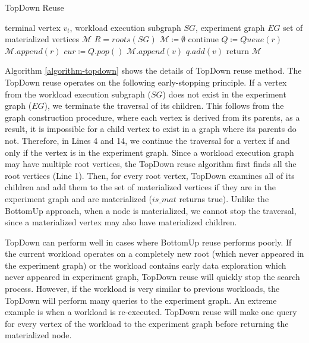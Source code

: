 {\begin{algorithm}[h]
\caption{TopDown Reuse}\label{algorithm-topdown}
\begin{algorithmic}[1]
\Require terminal vertex $v_t$, workload execution subgraph  $SG$, experiment graph $EG$ 
\Ensure set of materialized vertices $\mathcal{M}$ 
\State $R=roots(SG)$
\State $\mathcal{M} \coloneqq \emptyset$
		\State continue 
	\EndIf
	\State $Q \coloneqq  Queue(r)$  
		 \State	 $\mathcal{M}.append(r)$
	\EndIf
			\State $cur \coloneqq  Q.pop()$
					\State	$\mathcal{M}.append(v)$
				\EndIf
					\State $q.add(v)$
				\EndIf
			\EndFor
		\EndWhile
\EndFor
\State return $\mathcal{M}$
\end{algorithmic}
\end{algorithm}
Algorithm \ref{algorithm-topdown} shows the details of TopDown reuse method.
The TopDown reuse operates on the following early-stopping principle.
If a vertex from the workload execution subgraph ($SG$) does not exist in the experiment graph ($EG$), we terminate the traversal of its children.
This follows from the graph construction procedure, where each vertex is derived from its parents, as a result, it is impossible for a child vertex to exist in a graph where its parents do not.
Therefore, in Lines 4 and 14, we continue the traversal for a vertex if and only if the vertex is in the experiment graph.
Since a workload execution graph may have multiple root vertices, the TopDown reuse algorithm first finds all the root vertices (Line 1).
Then, for every root vertex, TopDown examines all of its children and add them to the set of materialized vertices if they are in the experiment graph and are materialized ($is\_mat$ returns true).
Unlike the BottomUp approach, when a node is materialized, we cannot stop the traversal, since a materialized vertex may also have materialized children.

TopDown can perform well in cases where BottomUp reuse performs poorly.
If the current workload operates on a completely new root (which never appeared in the experiment graph) or the workload contains early data exploration which never appeared in experiment graph, TopDown reuse will quickly stop the search process.
However, if the workload is very similar to previous workloads, the TopDown will perform many queries to the experiment graph.
An extreme example is when a workload is re-executed.
TopDown reuse will make one query for every vertex of the workload to the experiment graph before returning the materialized node.

}
